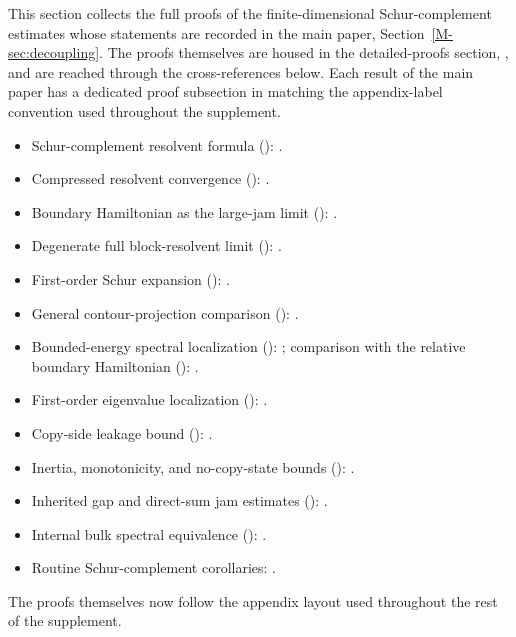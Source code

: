 \documentclass[11pt]{article}
\numberwithin{equation}{section}
\theoremstyle{definition}
\theoremstyle{remark}
\begin{document}
This section collects the full proofs of the finite-dimensional Schur-complement estimates whose
statements are recorded in the main paper, Section~\ref{M-sec:decoupling}. The proofs themselves
are housed in the detailed-proofs section, , and are reached
through the cross-references below. Each result of the main paper has a dedicated proof subsection
in  matching the appendix-label convention used throughout the supplement.
\begin{itemize}[leftmargin=2em]
\item Schur-complement resolvent formula (): .
\item Compressed resolvent convergence (): .
\item Boundary Hamiltonian as the large-jam limit ():
.
\item Degenerate full block-resolvent limit ():
.
\item First-order Schur expansion ():
.
\item General contour-projection comparison ():
.
\item Bounded-energy spectral localization ():
; comparison with the relative boundary Hamiltonian
(): .
\item First-order eigenvalue localization ():
.
\item Copy-side leakage bound (): .
\item Inertia, monotonicity, and no-copy-state bounds
():
.
\item Inherited gap and direct-sum jam estimates
():
.
\item Internal bulk spectral equivalence ():
.
\item Routine Schur-complement corollaries: .
\end{itemize}
The proofs themselves now follow the appendix layout used throughout the rest of the supplement.
\end{document}
